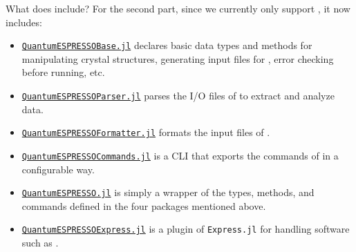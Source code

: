 \begin{frame}[allowframebreaks]{What does \express{} include?}
    For the second part, since we currently only support \qe{}, it now includes:
    {\footnotesize
    \begin{itemize}
        \item \href{https://github.com/MineralsCloud/QuantumESPRESSOBase.jl}{\texttt{QuantumESPRESSOBase.jl}}
              declares basic data types and methods
              for manipulating crystal structures, generating input files for \qe{},
              error checking before running, etc.
        \item \href{https://github.com/MineralsCloud/QuantumESPRESSOParser.jl}{\texttt{QuantumESPRESSOParser.jl}}
              parses the I/O files of \qe{} to extract and analyze data.
        \item \href{https://github.com/MineralsCloud/QuantumESPRESSOFormatter.jl}{\texttt{QuantumESPRESSOFormatter.jl}}
              formats the input files of \qe{}.
        \item \href{https://github.com/MineralsCloud/QuantumESPRESSOCommands.jl}{\texttt{QuantumESPRESSOCommands.jl}}
              is a CLI that exports the commands of \qe{} in a configurable way.
        \item \href{https://github.com/MineralsCloud/QuantumESPRESSO.jl}{\texttt{QuantumESPRESSO.jl}}
              is simply a wrapper of the types, methods, and commands defined in
              the four packages mentioned above.
        \item \href{https://github.com/MineralsCloud/QuantumESPRESSOExpress.jl}{\texttt{QuantumESPRESSOExpress.jl}}
              is a plugin of \texttt{Express.jl} for handling \ab{} software such as \qe{}.
    \end{itemize}
    }
\end{frame}
